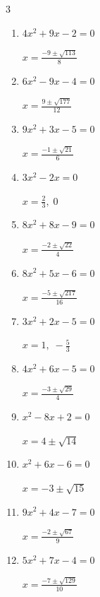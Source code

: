 \begin{multicols}{3}
\begin{enumerate}
        $\displaystyle x=\frac{-5\pm \sqrt{13}}{6}$

  \item $4x^{2}+9x-2=0$

        $\displaystyle x=\frac{-9\pm \sqrt{113}}{8}$

  \item $6x^{2}-9x-4=0$

        $\displaystyle x=\frac{9\pm \sqrt{177}}{12}$

  \item $9x^{2}+3x-5=0$

        $\displaystyle x=\frac{-1\pm \sqrt{21}}{6}$

  \item $3x^{2}-2x=0$

        $\displaystyle x=\frac{2}{3}, \; 0$

\columnbreak %

  \item $8x^{2}+8x-9=0$

        $\displaystyle x=\frac{-2\pm \sqrt{22}}{4}$

  \item $8x^{2}+5x-6=0$

        $\displaystyle x=\frac{-5\pm \sqrt{217}}{16}$

  \item $3x^{2}+2x-5=0$

        $\displaystyle x=1, \; -\frac{5}{3}$

  \item $4x^{2}+6x-5=0$

        $\displaystyle x=\frac{-3\pm \sqrt{29}}{4}$

  \item $x^{2}-8x+2=0$

        $\displaystyle x=4\pm \sqrt{14}$

  \item $x^{2}+6x-6=0$

        $\displaystyle x=-3\pm \sqrt{15}$

  \item $9x^{2}+4x-7=0$

        $\displaystyle x=\frac{-2\pm \sqrt{67}}{9}$

\columnbreak %

\resetques

  \item $5x^{2}+7x-4=0$

        $\displaystyle x=\frac{-7\pm \sqrt{129}}{10}$


\end{enumerate}
\end{multicols}
